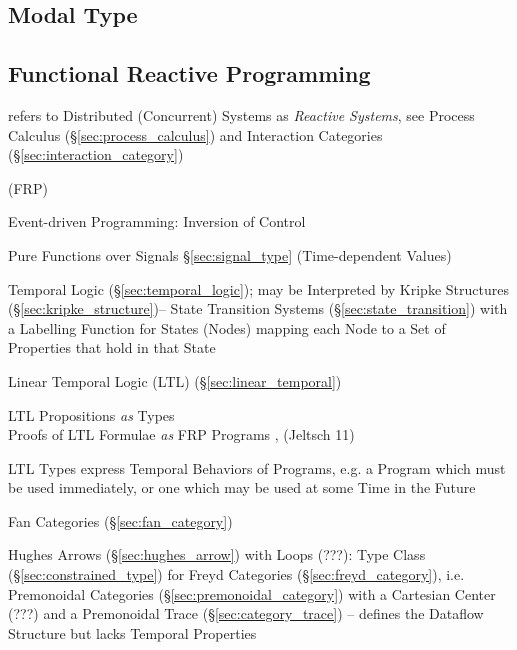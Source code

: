 \subsection{Modal Type}\label{sec:modal_type}

\subsection{Functional Reactive Programming}\label{sec:frp}


\fist \cite{winskel-nielsen93} refers to Distributed (Concurrent)
Systems as \emph{Reactive Systems}, see Process Calculus
(\S\ref{sec:process_calculus}) and Interaction Categories
(\S\ref{sec:interaction_category})

(FRP)

Event-driven Programming: Inversion of Control %

Pure Functions over Signals \S\ref{sec:signal_type} (Time-dependent Values)

Temporal Logic (\S\ref{sec:temporal_logic}); may be Interpreted by
Kripke Structures (\S\ref{sec:kripke_structure})-- State Transition
Systems (\S\ref{sec:state_transition}) with a Labelling Function for
States (Nodes) mapping each Node to a Set of Properties that hold in
that State

Linear Temporal Logic (LTL) (\S\ref{sec:linear_temporal})

LTL Propositions \emph{as} Types \\
Proofs of LTL Formulae \emph{as} FRP Programs \cite{jeffrey12},
(Jeltsch 11)

LTL Types express Temporal Behaviors of Programs, e.g. a Program which
must be used immediately, or one which may be used at some Time in the
Future \cite{jeffrey12} %

Fan Categories (\S\ref{sec:fan_category}) \cite{jeltsch12}

Hughes Arrows (\S\ref{sec:hughes_arrow}) with Loops (???): Type Class
(\S\ref{sec:constrained_type}) for Freyd Categories
(\S\ref{sec:freyd_category}), i.e. Premonoidal Categories
(\S\ref{sec:premonoidal_category}) with a Cartesian Center (???) and a
Premonoidal Trace (\S\ref{sec:category_trace}) -- defines the Dataflow
Structure but lacks Temporal Properties \cite{jeffrey12}

